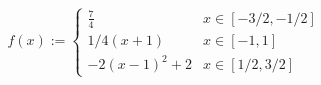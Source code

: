 \documentclass[11pt,letter,addpoints]{exam}
\begin{document}

\vspace{-1cm}
%
%
%
%


\begin{gather*}
    f(x):=\left\{
        \begin{array}{cl}
            \frac{7}{4}    & x\in[-3/2,-1/2] \\
            1/4(x+1) & x\in[-1,1] \\
            -2(x-1)^2+2 & x\in[1/2,3/2]
        \end{array}
        \right.
\end{gather*}
\end{document}
